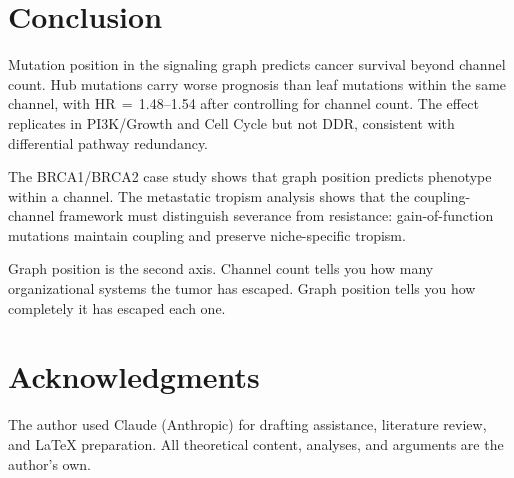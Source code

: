 \documentclass[11pt]{article}
\begin{document}
\section{Conclusion}
\label{sec:conclusion}

Mutation position in the signaling graph predicts cancer survival
beyond channel count. Hub mutations carry worse prognosis than leaf
mutations within the same channel, with HR\,$=$\,1.48--1.54 after
controlling for channel count. The effect replicates in PI3K/Growth
and Cell Cycle but not DDR, consistent with differential pathway
redundancy.

The BRCA1/BRCA2 case study shows that graph position predicts
phenotype within a channel. The metastatic tropism analysis shows
that the coupling-channel framework must distinguish severance from
resistance: gain-of-function mutations maintain coupling and preserve
niche-specific tropism.

Graph position is the second axis. Channel count tells you how many
organizational systems the tumor has escaped. Graph position tells
you how completely it has escaped each one.

\section*{Acknowledgments}

The author used Claude (Anthropic) for drafting assistance, literature
review, and \LaTeX{} preparation. All theoretical content, analyses,
and arguments are the author's own.
\end{document}
